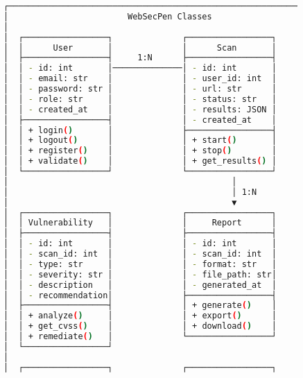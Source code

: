 \documentclass[main.tex]{subfiles}
\begin{document}
\begin{figure}[h]
\centering
\begin{lstlisting}[language=bash, caption=WebSecPen Class диаграм]
┌─────────────────────────────────────────────────────────────────┐
│                        WebSecPen Classes                        │
│                                                                 │
│  ┌─────────────────┐              ┌─────────────────┐           │
│  │      User       │              │      Scan       │           │
│  ├─────────────────┤     1:N      ├─────────────────┤           │
│  │ - id: int       │──────────────│ - id: int       │           │
│  │ - email: str    │              │ - user_id: int  │           │
│  │ - password: str │              │ - url: str      │           │
│  │ - role: str     │              │ - status: str   │           │
│  │ - created_at    │              │ - results: JSON │           │
│  ├─────────────────┤              │ - created_at    │           │
│  │ + login()       │              ├─────────────────┤           │
│  │ + logout()      │              │ + start()       │           │
│  │ + register()    │              │ + stop()        │           │
│  │ + validate()    │              │ + get_results() │           │
│  └─────────────────┘              └─────────────────┘           │
│                                             │                   │
│                                             │ 1:N               │
│                                             ▼                   │
│  ┌─────────────────┐              ┌─────────────────┐           │
│  │ Vulnerability   │              │     Report      │           │
│  ├─────────────────┤              ├─────────────────┤           │
│  │ - id: int       │              │ - id: int       │           │
│  │ - scan_id: int  │              │ - scan_id: int  │           │
│  │ - type: str     │              │ - format: str   │           │
│  │ - severity: str │              │ - file_path: str│           │
│  │ - description   │              │ - generated_at  │           │
│  │ - recommendation│              ├─────────────────┤           │
│  ├─────────────────┤              │ + generate()    │           │
│  │ + analyze()     │              │ + export()      │           │
│  │ + get_cvss()    │              │ + download()    │           │
│  │ + remediate()   │              └─────────────────┘           │
│  └─────────────────┘                                            │
│                                                                 │
│  ┌─────────────────┐              ┌─────────────────┐           │

\end{lstlisting}
\end{figure}
\end{document}
